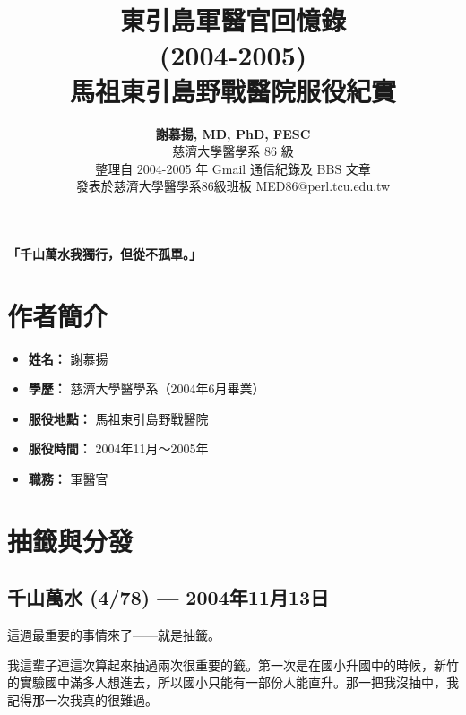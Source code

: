 \documentclass[12pt,a4paper]{article}
\title{
    \vspace{-1cm}
    {\Huge\bfseries\color{emergency_red} 東引島軍醫官回憶錄}\\[0.5cm]
    {\Large\color{emergency_blue} (2004-2005)}\\[1cm]
    {\large 馬祖東引島野戰醫院服役紀實}
}
\author{
    \textbf{謝慕揚, MD, PhD, FESC}\\[0.3cm]
    {\normalsize 慈濟大學醫學系 86 級}\\[0.2cm]
    {\small 整理自 2004-2005 年 Gmail 通信紀錄及 BBS 文章}\\
    {\small 發表於慈濟大學醫學系86級班板 MED86@perl.tcu.edu.tw}
}
\date{}
\begin{document}
\maketitle
\thispagestyle{empty}

\vfill

\begin{center}
\begin{tcolorbox}[
    colback=highlight_yellow,
    colframe=emergency_red,
    width=0.8\textwidth,
    arc=5pt,
    boxrule=1pt
]
\centering
\large\bfseries
「千山萬水我獨行，但從不孤單。」
\end{tcolorbox}
\end{center}

\vfill

\newpage

\tableofcontents
\newpage

\section{作者簡介}

\begin{itemize}[leftmargin=2cm]
    \item \textbf{姓名：} 謝慕揚
    \item \textbf{學歷：} 慈濟大學醫學系（2004年6月畢業）
    \item \textbf{服役地點：} 馬祖東引島野戰醫院
    \item \textbf{服役時間：} 2004年11月～2005年
    \item \textbf{職務：} 軍醫官
\end{itemize}

\section{抽籤與分發}

\subsection{千山萬水 (4/78) — 2004年11月13日}

這週最重要的事情來了——就是抽籤。

我這輩子連這次算起來抽過兩次很重要的籤。第一次是在國小升國中的時候，新竹的實驗國中滿多人想進去，所以國小只能有一部份人能直升。那一把我沒抽中，我記得那一次我真的很難過。
\end{document}
